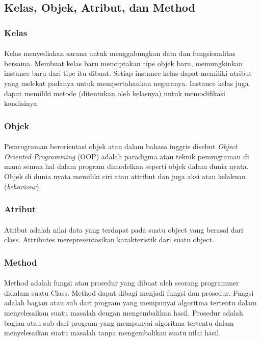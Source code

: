 \documentclass{article}
\begin{document}
    \subsection{Kelas, Objek, Atribut, dan Method}
        \subsubsection{Kelas}
            \paragraph{}Kelas menyediakan sarana untuk menggabungkan data dan fungsionalitas bersama. Membuat kelas baru menciptakan tipe objek baru, memungkinkan instance baru dari tipe itu dibuat. Setiap instance kelas dapat memiliki atribut yang melekat padanya untuk mempertahankan negaranya. Instance kelas juga dapat memiliki metode (ditentukan oleh kelasnya) untuk memodifikasi kondisinya.
        \subsubsection{Objek}
            \paragraph{}Pemrograman berorientasi objek atau dalam bahasa inggris disebut \textit{Object Oriented Programming} (OOP) adalah paradigma atau teknik pemrograman di mana semua hal dalam program dimodelkan seperti objek dalam dunia nyata. Objek di dunia nyata memiliki ciri atau attribut dan juga aksi atau kelakuan (\textit{behaviour}).
        \subsubsection{Atribut}
            \paragraph{}Atribut adalah nilai data yang terdapat pada suatu object yang berasal dari class. Attributes merepresentasikan karakteristik dari suatu object.
        \subsubsection{Method}
            \paragraph{}Method adalah fungsi atau prosedur yang dibuat oleh seorang programmer didalam suatu Class. Method dapat dibagi menjadi fungsi dan prosedur. Fungsi adalah bagian atau sub dari program yang mempunyai algoritma tertentu dalam menyelesaikan suatu masalah dengan mengembalikan hasil. Prosedur adalah bagian atau sub dari program yang mempunyai algoritma tertentu dalam menyelesaikan suatu masalah tanpa mengembalikan suatu nilai hasil. 
                
                
\end{document}
